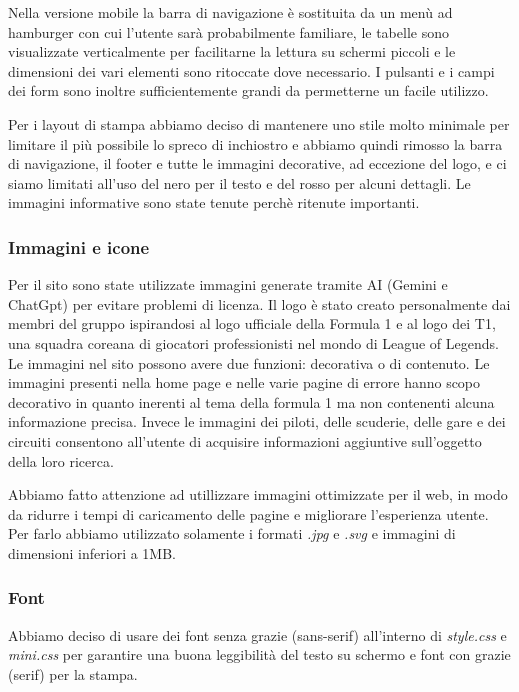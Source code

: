 \documentclass[11pt,a4paper]{article}
\begin{document}
\vspace{0.5cm}

Nella versione mobile la barra di navigazione è sostituita da un menù ad hamburger con cui l'utente sarà probabilmente familiare, le tabelle sono visualizzate verticalmente per facilitarne la lettura su schermi piccoli
 e le dimensioni dei vari elementi sono ritoccate dove necessario. I pulsanti e i campi dei form sono inoltre sufficientemente grandi da permetterne un facile utilizzo.

\vspace{0.5cm}

Per i layout di stampa abbiamo deciso di mantenere uno stile molto minimale per limitare il più possibile lo spreco di inchiostro e abbiamo quindi rimosso la barra di navigazione, il footer e tutte le immagini decorative, ad eccezione del logo,
e ci siamo limitati all'uso del nero per il testo e del rosso per alcuni dettagli. Le immagini informative sono state tenute perchè ritenute importanti.

\subsubsection{Immagini e icone}
Per il sito sono state utilizzate immagini generate tramite AI (Gemini e ChatGpt) per evitare problemi di licenza.
Il logo è stato creato personalmente dai membri del gruppo ispirandosi al logo ufficiale della Formula 1 e al logo dei T1, una squadra coreana di giocatori professionisti nel mondo di League of Legends.
Le immagini nel sito possono avere due funzioni: decorativa o di contenuto.
Le immagini presenti nella home page e nelle varie pagine di errore hanno scopo decorativo in quanto inerenti al tema della formula 1 ma non contenenti alcuna informazione precisa.
Invece le immagini dei piloti, delle scuderie, delle gare e dei circuiti consentono all'utente di acquisire informazioni aggiuntive sull'oggetto della loro ricerca.

\vspace{0.5cm}

Abbiamo fatto attenzione ad utillizzare immagini ottimizzate per il web, in modo da ridurre i tempi di caricamento delle pagine e migliorare l'esperienza utente.
Per farlo abbiamo utilizzato solamente i formati \textit{.jpg} e \textit{.svg} e immagini di dimensioni inferiori a 1MB.
\subsubsection{Font}
Abbiamo deciso di usare dei font senza grazie (sans-serif) all'interno di \textit{style.css} e \textit{mini.css} per garantire una buona leggibilità del testo su schermo e font con grazie (serif) per la stampa.
\end{document}
